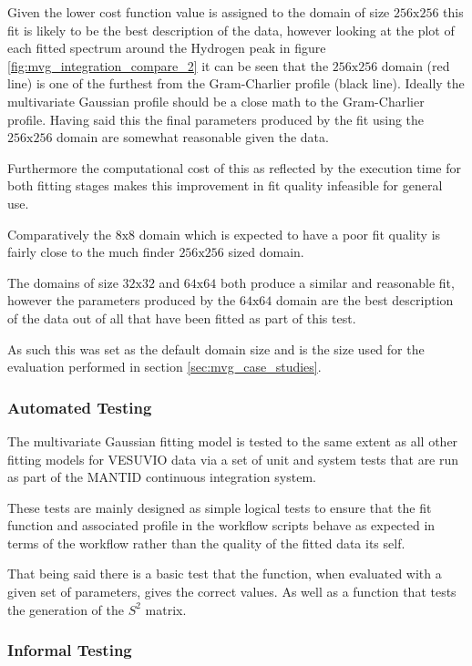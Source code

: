 \documentclass[a4paper]{article}
\begin{document}
Given the lower cost function value is assigned to the domain of size
$\mathrm{256x256}$ this fit is likely to be the best description of the data,
however looking at the plot of each fitted spectrum around the Hydrogen peak in
figure \ref{fig:mvg_integration_compare_2} it can be seen that the
$\mathrm{256x256}$ domain (red line) is one of the furthest from the
Gram-Charlier profile (black line). Ideally the multivariate Gaussian profile
should be a close math to the Gram-Charlier profile. Having said this the final
parameters produced by the fit using the $\mathrm{256x256}$ domain are
somewhat reasonable given the data.

Furthermore the computational cost of this as reflected by the execution time
for both fitting stages makes this improvement in fit quality infeasible for
general use.

Comparatively the $\mathrm{8x8}$ domain which is expected to have a poor fit
quality is fairly close to the much finder $\mathrm{256x256}$ sized domain.

The domains of size $\mathrm{32x32}$ and $\mathrm{64x64}$ both produce a similar
and reasonable fit, however the parameters produced by the $\mathrm{64x64}$
domain are the best description of the data out of all that have been fitted as
part of this test.

As such this was set as the default domain size and is the size used for the
evaluation performed in section \ref{sec:mvg_case_studies}.

\subsubsection{Automated Testing}

The multivariate Gaussian fitting model is tested to the same extent as all
other fitting models for VESUVIO data via a set of unit and system tests that
are run as part of the \gls*{MANTID} continuous integration system.

These tests are mainly designed as simple logical tests to ensure that the
fit function and associated profile in the workflow scripts behave as expected
in terms of the workflow rather than the quality of the fitted data its self.

That being said there is a basic test that the function, when evaluated with a
given set of parameters, gives the correct values. As well as a function that
tests the generation of the $S^{2}$ matrix.

\subsubsection{Informal Testing}
\label{sec:mvg_informal_testing}
\end{document}

